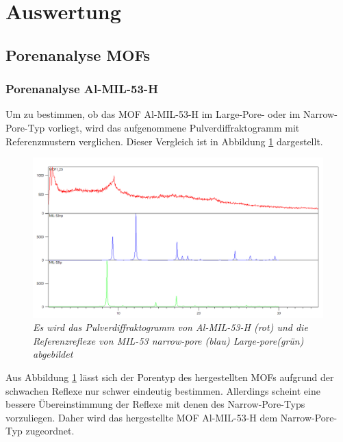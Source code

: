 \documentclass[12pt, a4paper]{article}
\begin{document}
\newpage
\section{Auswertung}
\subsection{Porenanalyse MOFs}
\subsubsection{Porenanalyse Al-MIL-53-H}
Um zu bestimmen, ob das MOF Al-MIL-53-H im Large-Pore- oder im Narrow-Pore-Typ vorliegt, wird das aufgenommene Pulverdiffraktogramm mit Referenzmustern verglichen. 
Dieser Vergleich ist in Abbildung \ref{MOF125ver} dargestellt.
\begin{figure}[!ht]
    \centering
    \includegraphics[scale=0.5]{MOF125ver.png}
    \caption{\textit{Es wird das Pulverdiffraktogramm von Al-MIL-53-H (rot) und die Referenzreflexe von MIL-53 narrow-pore (blau) Large-pore(grün) abgebildet}}
    \label{MOF125ver}
\end{figure}

\noindent
Aus Abbildung \ref{MOF125ver} lässt sich der Porentyp des hergestellten MOFs aufgrund der schwachen Reflexe nur schwer eindeutig bestimmen. 
Allerdings scheint eine bessere Übereinstimmung der Reflexe mit denen des Narrow-Pore-Typs vorzuliegen. 
Daher wird das hergestellte MOF Al-MIL-53-H dem Narrow-Pore-Typ zugeordnet.
\end{document}

